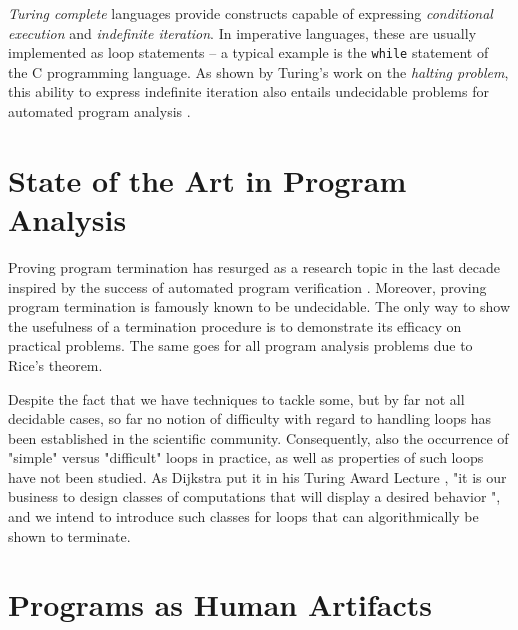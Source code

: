 \emph{Turing complete} languages provide constructs capable of expressing \emph{conditional execution} and \emph{indefinite iteration}. In imperative languages, these are usually implemented as loop statements -- a typical example is the \verb|while| statement of the C programming language. As shown by Turing's work on the \emph{halting problem}, this ability to express indefinite iteration also entails undecidable problems for automated program analysis \cite{turing}.

\section{State of the Art in Program Analysis}

 Proving program termination has resurged as a research topic in the last decade inspired by the success of automated program verification \cite{DBLP:journals/cacm/CookPR11}. Moreover, proving program termination is famously known to be undecidable. The only way to show the usefulness of a termination procedure is to demonstrate its efficacy on practical problems. The same goes for all program analysis problems due to Rice's theorem.

Despite the fact that we have techniques to tackle some, but by far not all decidable cases, so far no notion of difficulty with regard to handling loops has been established in the scientific community. Consequently, also the occurrence of "simple" versus "difficult" loops in practice, as well as properties of such loops have not been studied. As Dijkstra put it in his Turing Award Lecture , "it is our business to design classes of computations that will display a desired behavior \cite{DBLP:journals/cacm/Dijkstra72}", and we intend to introduce such classes for loops that can algorithmically be shown to terminate.

\section{Programs as Human Artifacts}

